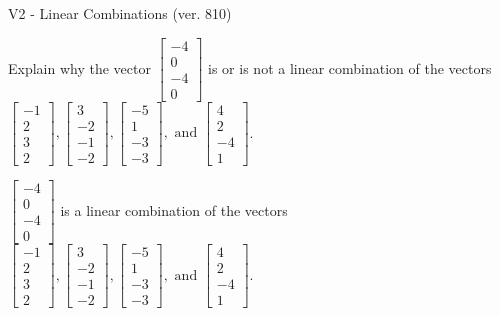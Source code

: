 \begin{exercise}
  \begin{exerciseTitle}V2 - Linear Combinations (ver. 810)\end{exerciseTitle}
  \begin{exerciseStatement}
    Explain why the vector \(\left[\begin{array}{c}
-4 \\
0 \\
-4 \\
0
\end{array}\right]\)  is or is not a linear 
	combination of the vectors \(\left[\begin{array}{c}
-1 \\
2 \\
3 \\
2
\end{array}\right] , \left[\begin{array}{c}
3 \\
-2 \\
-1 \\
-2
\end{array}\right] , \left[\begin{array}{c}
-5 \\
1 \\
-3 \\
-3
\end{array}\right] , \text{ and } \left[\begin{array}{c}
4 \\
2 \\
-4 \\
1
\end{array}\right]\).
	


  \end{exerciseStatement}
  \begin{exerciseAnswer}
   \(\left[\begin{array}{c}
-4 \\
0 \\
-4 \\
0
\end{array}\right]\) 
  	 is  
	a linear combination of the vectors \(\left[\begin{array}{c}
-1 \\
2 \\
3 \\
2
\end{array}\right] , \left[\begin{array}{c}
3 \\
-2 \\
-1 \\
-2
\end{array}\right] , \left[\begin{array}{c}
-5 \\
1 \\
-3 \\
-3
\end{array}\right] , \text{ and } \left[\begin{array}{c}
4 \\
2 \\
-4 \\
1
\end{array}\right]\).


\end{exerciseAnswer}
\end{exercise}
